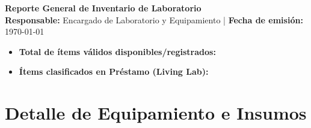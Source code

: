 \documentclass[a4paper, 11pt]{article}
\begin{document}
\begin{center}
    {\LARGE \bfseries \color{colorPrimario} Reporte General de Inventario de Laboratorio} \\[0.3cm]
    {\small \textbf{Responsable:} Encargado de Laboratorio y Equipamiento \quad | \quad \textbf{Fecha de emisión:} \today}
\end{center}

\vspace{0.3cm}

\begin{tcolorbox}[
    colback=colorPrimario!5!white,
    colframe=colorPrimario,
    title=\textbf{\color{white} Resumen Ejecutivo de Métricas},
    arc=2mm,
    boxrule=1pt,
    fonttitle=\bfseries
]
    \begin{itemize}[leftmargin=1.5em, itemsep=0.3em]
        \item \textbf{Total de ítems válidos disponibles/registrados:} \totalItemsValidos
        \item \textbf{Ítems clasificados en Préstamo (Living Lab):} \totalPrestamos
    \end{itemize}
\end{tcolorbox}

\vspace{0.4cm}

\section*{\color{colorPrimario} Detalle de Equipamiento e Insumos}
\vspace{-0.2cm}


\end{document}
